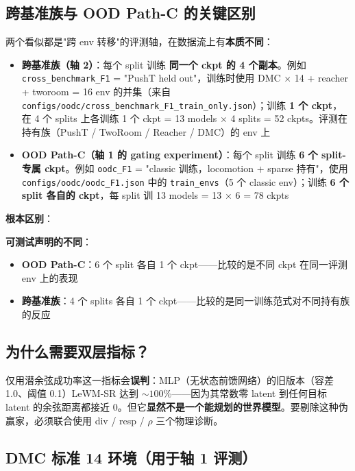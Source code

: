 \documentclass[11pt,a4paper]{article}
\begin{document}
\subsection{跨基准族与 OOD Path-C 的关键区别}

两个看似都是"跨 env 转移"的评测轴，在数据流上有\textbf{本质不同}：

\begin{itemize}[leftmargin=2em]
    \item \textbf{跨基准族（轴 2）}：每个 split 训练 \textbf{同一个 ckpt 的 4 个副本}。例如 \texttt{cross\_benchmark\_F1} = "PushT held out"，训练时使用 DMC × 14 + reacher + tworoom = 16 env 的并集（来自 \texttt{configs/oodc/cross\_benchmark\_F1\_train\_only.json}）；训练 \textbf{1 个 ckpt}，在 4 个 splits 上各训练 1 个 ckpt = 13 models × 4 splits = 52 ckpts。评测在持有族（PushT / TwoRoom / Reacher / DMC）的 env 上
    \item \textbf{OOD Path-C（轴 1 的 gating experiment）}：每个 split 训练 \textbf{6 个 split-专属 ckpt}。例如 \texttt{oodc\_F1} = "classic 训练，locomotion + sparse 持有"，使用 \texttt{configs/oodc/oodc\_F1.json} 中的 \texttt{train\_envs}（5 个 classic env）；训练 \textbf{6 个 split 各自的 ckpt}，每 split 训 13 models = 13 × 6 = 78 ckpts
\end{itemize}

\textbf{根本区别}：

\textbf{可测试声明的不同}：
\begin{itemize}[leftmargin=2em]
    \item \textbf{OOD Path-C}：6 个 split 各自 1 个 ckpt——比较的是不同 ckpt 在同一评测 env 上的表现
    \item \textbf{跨基准族}：4 个 splits 各自 1 个 ckpt——比较的是同一训练范式对不同持有族的反应
\end{itemize}

\subsection{为什么需要双层指标？}

仅用潜余弦成功率这一指标会\textbf{误判}：MLP（无状态前馈网络）的旧版本（容差 1.0、阈值 0.1）LeWM-SR 达到 $\sim 100\%$——因为其常数零 latent 到任何目标 latent 的余弦距离都接近 0。但它\textbf{显然不是一个能规划的世界模型}。要剔除这种伪赢家，必须联合使用 div / resp / \ensuremath{\rho} 三个物理诊断。


\subsection{DMC 标准 14 环境（用于轴 1 评测）}
\end{document}
